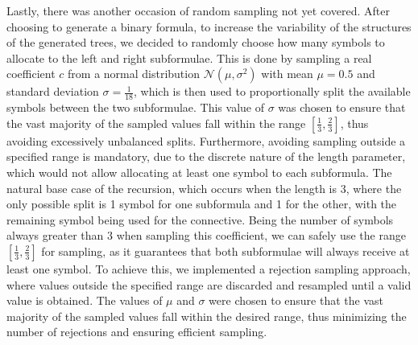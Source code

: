 Lastly, there was another occasion of random sampling not yet covered.
After choosing to generate a binary formula, to increase the variability of the structures of the generated trees, we decided to randomly choose how many symbols to allocate to the left and right subformulae.
This is done by sampling a real coefficient \(c\) from a normal distribution \(\mathcal{N}(\mu, \sigma^2)\) with mean \(\mu = 0.5\) and standard deviation \(\sigma = \frac{1}{18}\), which is then used to proportionally split the available symbols between the two subformulae.
This value of \(\sigma\) was chosen to ensure that the vast majority of the sampled values fall within the range \([\frac{1}{3}, \frac{2}{3}]\), thus avoiding excessively unbalanced splits.
Furthermore, avoiding sampling outside a specified range is mandatory, due to the discrete nature of the length parameter, which would not allow allocating at least one symbol to each subformula.
The natural base case of the recursion, which occurs when the length is \(3\), where the only possible split is 1 symbol for one subformula and 1 for the other, with the remaining symbol being used for the connective.
Being the number of symbols always greater than \(3\) when sampling this coefficient, we can safely use the range \([\frac{1}{3}, \frac{2}{3}]\) for sampling, as it guarantees that both subformulae will always receive at least one symbol.
To achieve this, we implemented a rejection sampling approach, where values outside the specified range are discarded and resampled until a valid value is obtained.
The values of \(\mu\) and \(\sigma\) were chosen to ensure that the vast majority of the sampled values fall within the desired range, thus minimizing the number of rejections and ensuring efficient sampling.

